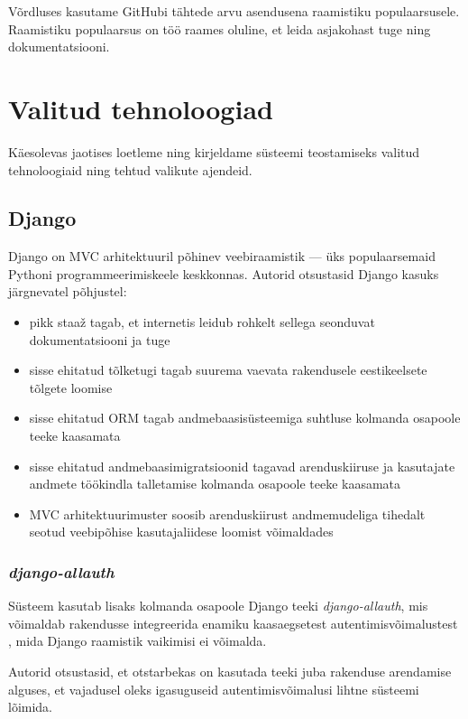 Võrdluses kasutame GitHubi tähtede arvu asendusena raamistiku populaarsusele. Raamistiku populaarsus on töö raames oluline, et leida asjakohast tuge ning dokumentatsiooni.

\section{Valitud tehnoloogiad}

Käesolevas jaotises loetleme ning kirjeldame süsteemi teostamiseks valitud tehnoloogiaid ning tehtud valikute ajendeid.

\subsection{Django}

Django on MVC arhitektuuril põhinev veebiraamistik — üks populaarsemaid Pythoni programmeerimiskeele keskkonnas. Autorid otsustasid Django kasuks järgnevatel põhjustel:

\begin{itemize}
  \item pikk staaž tagab, et internetis leidub rohkelt sellega seonduvat dokumentatsiooni ja tuge
  \item sisse ehitatud tõlketugi tagab suurema vaevata rakendusele eestikeelsete tõlgete loomise
  \item sisse ehitatud ORM tagab andmebaasisüsteemiga suhtluse kolmanda osapoole teeke kaasamata
  \item sisse ehitatud andmebaasimigratsioonid tagavad arenduskiiruse ja kasutajate andmete töökindla talletamise kolmanda osapoole teeke kaasamata
  \item MVC arhitektuurimuster soosib arenduskiirust andmemudeliga tihedalt seotud veebipõhise kasutajaliidese loomist võimaldades
\end{itemize}

\subsubsection{\textit{django-allauth}}

Süsteem kasutab lisaks kolmanda osapoole Django teeki \emph{django-allauth}, mis võimaldab rakendusse integreerida enamiku kaasaegsetest autentimisvõimalustest \cite{django-allauth-introduction}, mida Django raamistik vaikimisi ei võimalda.

Autorid otsustasid, et otstarbekas on kasutada teeki juba rakenduse arendamise alguses, et vajadusel oleks igasuguseid autentimisvõimalusi lihtne süsteemi lõimida.

